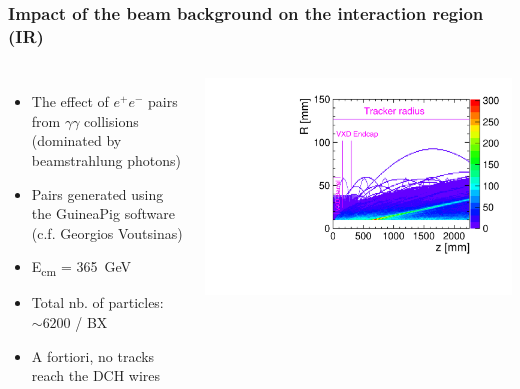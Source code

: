 \documentclass[aspectratio=169, hyperref={colorlinks=true,pdfpagelabels=false,linkcolor=black}, xcolor=dvipsnames,10pt]{beamer}
\begin{document}
\begin{frame}
	\frametitle{Impact of the beam background on the interaction region (IR)}

	\begin{columns}
	\begin{itemize}
	\item The effect of $e^{+}e^{-}$ pairs from $\gamma\gamma$ collisions (dominated by beamstrahlung photons)
	\item Pairs generated using the GuineaPig software (c.f. Georgios Voutsinas)
	\item E\textsubscript{cm} = 365~GeV
	\item Total nb. of particles: $\sim6200$ / BX
        \item A fortiori, no tracks reach the DCH wires\vspace{0.2cm}
	\end{itemize}		
		\centering
		\includegraphics[width=\textwidth]{../figures/pairs_R_Z_legend.pdf}
	\end{columns}	
	
\end{frame}
\end{document}
